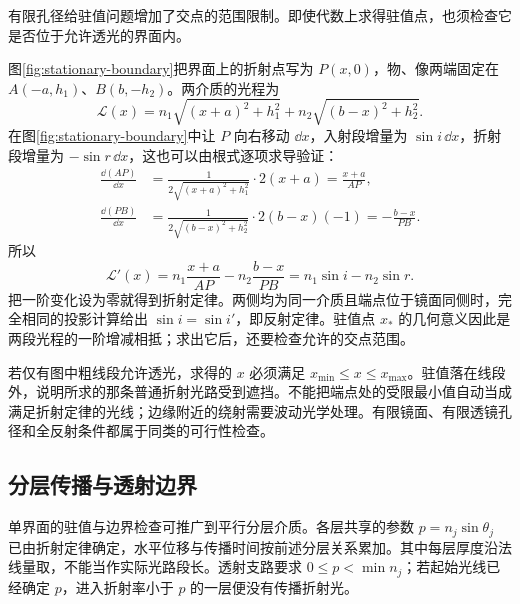 有限孔径给驻值问题增加了交点的范围限制。即使代数上求得驻值点，也须检查它是否位于允许透光的界面内。

图\ref{fig:stationary-boundary}把界面上的折射点写为 $P(x,0)$，物、像两端固定在 $A(-a,h_1)$、$B(b,-h_2)$。两介质的光程为
\[
 \mathcal L(x)=n_1\sqrt{(x+a)^2+h_1^2}
             +n_2\sqrt{(b-x)^2+h_2^2}.
\]
在图\ref{fig:stationary-boundary}中让 $P$ 向右移动 $\dd x$，入射段增量为 $\sin i\,\dd x$，折射段增量为 $-\sin r\,\dd x$，这也可以由根式逐项求导验证：
\begin{align*}
\frac{\dd(AP)}{\dd x}
&=\frac{1}{2\sqrt{(x+a)^2+h_1^2}}\cdot2(x+a)
=\frac{x+a}{AP},\\
\frac{\dd(PB)}{\dd x}
&=\frac{1}{2\sqrt{(b-x)^2+h_2^2}}\cdot2(b-x)(-1)
=-\frac{b-x}{PB}.
\end{align*}
所以
\[
\mathcal L'(x)=n_1\frac{x+a}{AP}-n_2\frac{b-x}{PB}
=n_1\sin i-n_2\sin r.
\]
把一阶变化设为零就得到折射定律。两侧均为同一介质且端点位于镜面同侧时，完全相同的投影计算给出 $\sin i=\sin i'$，即反射定律。驻值点 $x_*$ 的几何意义因此是两段光程的一阶增减相抵；求出它后，还要检查允许的交点范围。

若仅有图中粗线段允许透光，求得的 $x$ 必须满足 $x_{\min}\le x\le x_{\max}$。驻值落在线段外，说明所求的那条普通折射光路受到遮挡。不能把端点处的受限最小值自动当成满足折射定律的光线；边缘附近的绕射需要波动光学处理。有限镜面、有限透镜孔径和全反射条件都属于同类的可行性检查。

\subsection{分层传播与透射边界}

单界面的驻值与边界检查可推广到平行分层介质。各层共享的参数 $p=n_j\sin\theta_j$ 已由折射定律确定，水平位移与传播时间按前述分层关系累加。其中每层厚度沿法线量取，不能当作实际光路段长。透射支路要求 $0\le p<\min n_j$；若起始光线已经确定 $p$，进入折射率小于 $p$ 的一层便没有传播折射光。

